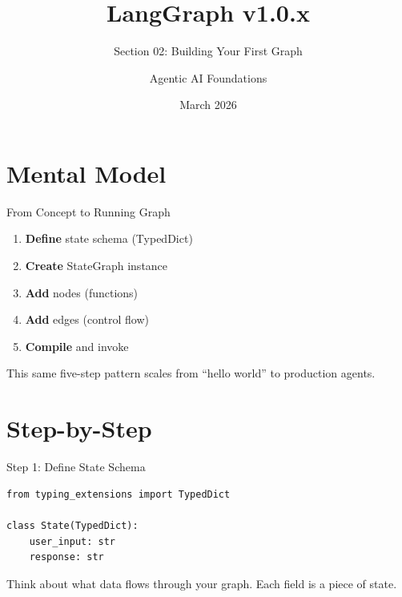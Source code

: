 \documentclass[aspectratio=169,11pt]{beamer}
\title{LangGraph v1.0.x}
\subtitle{Section 02: Building Your First Graph}
\author{Agentic AI Foundations}
\date{March 2026}
\begin{document}
\begin{frame}
\titlepage
\end{frame}

\section{Mental Model}
\begin{frame}[t]{From Concept to Running Graph}
\setlength{\itemsep}{1pt}
\vspace{0.1cm}

\begin{conceptbox}
\setlength{\itemsep}{1pt}
\begin{enumerate}
\setlength{\itemsep}{1pt}
  \item \textbf{Define} state schema (TypedDict)
  \item \textbf{Create} StateGraph instance
  \item \textbf{Add} nodes (functions)
  \item \textbf{Add} edges (control flow)
  \item \textbf{Compile} and invoke
\end{enumerate}
\end{conceptbox}

\vspace{0.15cm}

This same five-step pattern scales from ``hello world'' to production agents.
\end{frame}

\section{Step-by-Step}
\begin{frame}[fragile,t]{Step 1: Define State Schema}
\vspace{0.1cm}

\begin{codebox}[TypedDict]
\begin{lstlisting}
from typing_extensions import TypedDict

class State(TypedDict):
    user_input: str
    response: str
\end{lstlisting}
\end{codebox}

\vspace{0.1cm}

\begin{tipbox}
Think about what data flows through your graph. Each field is a piece of state.
\end{tipbox}
\end{frame}
\end{document}

